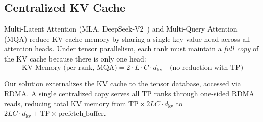 \documentclass[11pt,letterpaper]{article}
\theoremstyle{definition}
\begin{document}
\begin{table}[htbp]
\centering
\caption{Thesis concepts mapped to \texttt{tensor\_rdma} modules}
\label{tab:module-mapping}
\end{table}

\subsection{Centralized KV Cache}

Multi-Latent Attention (MLA, DeepSeek-V2~\cite{deepseekv2}) and Multi-Query Attention (MQA) reduce KV cache memory by sharing a single key-value head across all attention heads. Under tensor parallelism, each rank must maintain a \emph{full copy} of the KV cache because there is only one head:
\begin{equation}
    \text{KV Memory (per rank, MQA)} = 2 \cdot L \cdot C \cdot d_{\text{kv}} \quad \text{(no reduction with TP)}
\end{equation}

Our solution externalizes the KV cache to the tensor database, accessed via RDMA. A single centralized copy serves all TP ranks through one-sided RDMA reads, reducing total KV memory from $\text{TP} \times 2LC \cdot d_{\text{kv}}$ to $2LC \cdot d_{\text{kv}} + \text{TP} \times \text{prefetch\_buffer}$.
\end{document}
